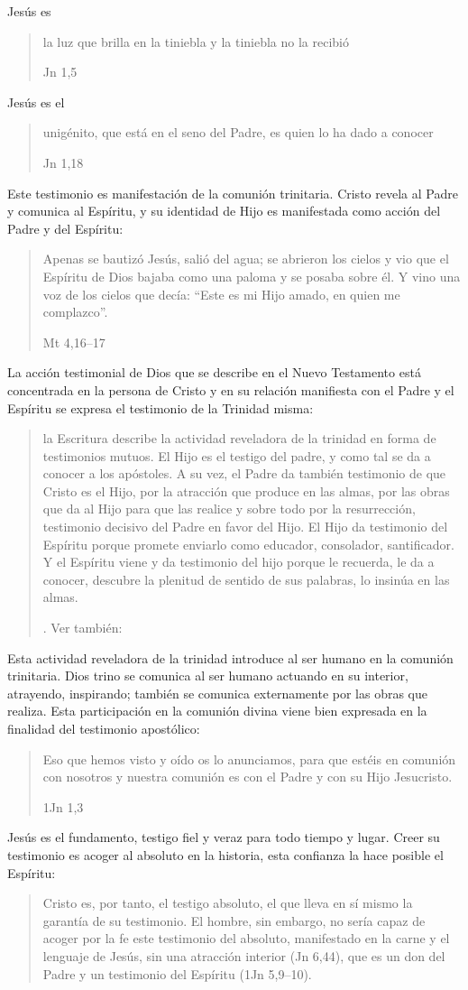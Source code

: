 Jesús es \blockquote[Jn 1,5]{la luz que brilla en la tiniebla y la tiniebla no
  la recibió}. Jesús es el \blockquote[Jn 1,18]{unigénito, que está en el seno
  del Padre, es quien lo ha dado a conocer}. Este testimonio es manifestación de
la comunión trinitaria. Cristo revela al Padre y comunica al Espíritu, y su
identidad de Hijo es manifestada como acción del Padre y del Espíritu:
\blockquote[Mt 4,16--17]{Apenas se bautizó Jesús, salió del agua; se abrieron
  los cielos y vio que el Espíritu de Dios bajaba como una paloma y se posaba
  sobre él. Y vino una voz de los cielos que decía: \enquote{Este es mi Hijo
    amado, en quien me complazco}.}

La acción testimonial de Dios que se describe en el Nuevo Testamento está
concentrada en la persona de Cristo y en su relación manifiesta con el Padre y
el Espíritu se expresa el testimonio de la Trinidad misma:
\blockquote[{\cite[410]{latourelle1999rev}}. Ver también:
{\cite[131]{prades2015testimonio}}]{la Escritura describe la actividad
  reveladora de la trinidad en forma de testimonios mutuos. El Hijo es el
  testigo del padre, y como tal se da a conocer a los apóstoles. A su vez, el
  Padre da también testimonio de que Cristo es el Hijo, por la atracción que
  produce en las almas, por las obras que da al Hijo para que las realice y
  sobre todo por la resurrección, testimonio decisivo del Padre en favor del
  Hijo. El Hijo da testimonio del Espíritu porque promete enviarlo como
  educador, consolador, santificador. Y el Espíritu viene y da testimonio del
  hijo porque le recuerda, le da a conocer, descubre la plenitud de sentido de
  sus palabras, lo insinúa en las almas.}
Esta actividad reveladora de la trinidad introduce al ser humano en la comunión
trinitaria. Dios trino se comunica al ser humano actuando en su interior,
atrayendo, inspirando; también se comunica externamente por las obras que
realiza. Esta participación en la comunión divina viene bien expresada en la
finalidad del testimonio apostólico:
\blockquote[1Jn 1,3]{Eso que hemos visto y oído os lo anunciamos, para que
  estéis en comunión con nosotros y nuestra comunión es con el Padre y con su
  Hijo Jesucristo.}

Jesús es el fundamento, testigo fiel y veraz para todo tiempo y
lugar.\autocite[Cf.][132]{prades2015testimonio} Creer su testimonio es acoger al
absoluto en la historia, esta confianza la hace posible el Espíritu:
\blockquote[{\cite{latourelle2000testimonio}}]{Cristo es, por tanto, el testigo
  absoluto, el que lleva en sí mismo la garantía de su testimonio. El hombre,
  sin embargo, no sería capaz de acoger por la fe este testimonio del absoluto,
  manifestado en la carne y el lenguaje de Jesús, sin una atracción interior (Jn
  6,44), que es un don del Padre y un testimonio del Espíritu (1Jn 5,9--10).}

